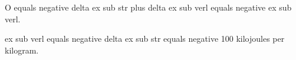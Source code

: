 O equals negative delta ex sub str plus delta ex sub verl equals negative ex sub verl.  

ex sub verl equals negative delta ex sub str equals negative 100 kilojoules per kilogram.